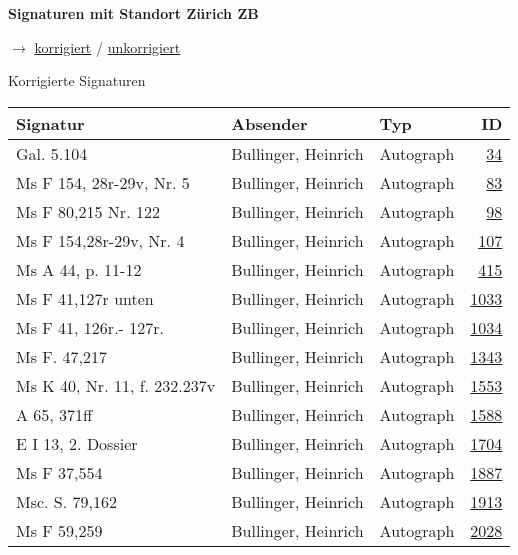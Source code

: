 \documentclass[10pt,a4paper,landscape]{report}
\begin{document}
{\LARGE \textbf{Signaturen mit Standort \flqq Zürich ZB\frqq}}

\vspace*{0.1cm}
$\rightarrow$ \hyperlink{link:corr}{korrigiert} / \hyperlink{link:uncorr}{unkorrigiert}

\vspace*{1cm}	

\hypertarget{link:corr}{Korrigierte Signaturen}


\begin{longtable}{p{16cm}p{4cm}lr}
\toprule
Signatur & Absender & Typ & ID\\
\midrule
Gal. 5.104	&	Bullinger, Heinrich	&	Autograph	&	\href{http://130.60.24.72/assignment/34}{34}\\
Ms F 154, 28r-29v, Nr. 5	&	Bullinger, Heinrich	&	Autograph	&	\href{http://130.60.24.72/assignment/83}{83}\\
Ms F 80,215 Nr. 122	&	Bullinger, Heinrich	&	Autograph	&	\href{http://130.60.24.72/assignment/98}{98}\\
Ms F 154,28r-29v, Nr. 4	&	Bullinger, Heinrich	&	Autograph	&	\href{http://130.60.24.72/assignment/107}{107}\\
Ms A 44, p. 11-12	&	Bullinger, Heinrich	&	Autograph	&	\href{http://130.60.24.72/assignment/415}{415}\\
Ms F 41,127r unten	&	Bullinger, Heinrich	&	Autograph	&	\href{http://130.60.24.72/assignment/1033}{1033}\\
Ms F 41, 126r.- 127r.	&	Bullinger, Heinrich	&	Autograph	&	\href{http://130.60.24.72/assignment/1034}{1034}\\
Ms F. 47,217	&	Bullinger, Heinrich	&	Autograph	&	\href{http://130.60.24.72/assignment/1343}{1343}\\
Ms K 40, Nr. 11, f. 232.237v	&	Bullinger, Heinrich	&	Autograph	&	\href{http://130.60.24.72/assignment/1553}{1553}\\
A 65, 371ff	&	Bullinger, Heinrich	&	Autograph	&	\href{http://130.60.24.72/assignment/1588}{1588}\\
E I 13, 2. Dossier	&	Bullinger, Heinrich	&	Autograph	&	\href{http://130.60.24.72/assignment/1704}{1704}\\
Ms F 37,554	&	Bullinger, Heinrich	&	Autograph	&	\href{http://130.60.24.72/assignment/1887}{1887}\\
Msc. S. 79,162	&	Bullinger, Heinrich	&	Autograph	&	\href{http://130.60.24.72/assignment/1913}{1913}\\
Ms F 59,259	&	Bullinger, Heinrich	&	Autograph	&	\href{http://130.60.24.72/assignment/2028}{2028}\\

\end{longtable}
\end{document}
